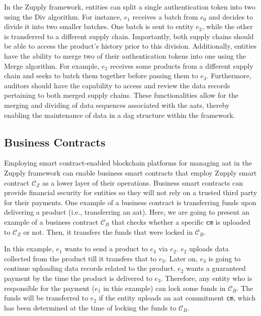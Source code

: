 In the Zupply framework, entities can split a single authentication token into two using the \textsf{Div} algorithm. For instance, ${e_{1}}$ receives a batch from ${e_{0}}$ and decides to divide it into two smaller batches. One batch is sent to entity ${e_{2}}$, while the other is transferred to a different supply chain. Importantly, both supply chains should be able to access the product's history prior to this division. Additionally, entities have the ability to merge two of their authentication tokens into one using the \textsf{Merge} algorithm. For example, ${e_{2}}$ receives some products from a different supply chain and seeks to batch them together before passing them to ${e_{3}}$. Furthermore, auditors should have the capability to access and review the data records pertaining to both merged supply chains. These functionalities allow for the merging and dividing of data sequences associated with the \gls{aat}s, thereby enabling the maintenance of data in a \gls{dag} structure within the framework.



\subsection{Business Contracts}
\label{App:Business Contracts}


Employing smart contract-enabled blockchain platforms for managing \gls{aat} in the Zupply framework can enable business smart contracts that employ Zupply smart contract $\mathcal{C}_Z$ as a lower layer of their operations. Business smart contracts can provide financial security for entities so they will not rely on a trusted third party for their payments. One example of a business contract is transferring funds upon delivering a product (i.e., transferring an \gls{aat}). Here, we are going to present an example of a business contract $\mathcal{C}_B$ that checks whether a specific \texttt{cm} is uploaded to $\mathcal{C}_Z$ or not. Then, it transfers the funds that were locked in $\mathcal{C}_B$.

In this example, $e_1$ wants to send a product to $e_3$ via $e_2$. $e_2$ uploads data collected from the product till it transfers that to $e_3$. Later on, $e_3$ is going to continue uploading data records related to the product. $e_2$ wants a guaranteed payment by the time the product is delivered to $e_3$. Therefore, any entity who is responsible for the payment ($e_1$ in this example) can lock some funds in $\mathcal{C}_B$. The funds will be transferred to $e_2$ if the entity uploads an \gls{aat} commitment \texttt{cm}, which has been determined at the time of locking the funds to $\mathcal{C}_B$.


